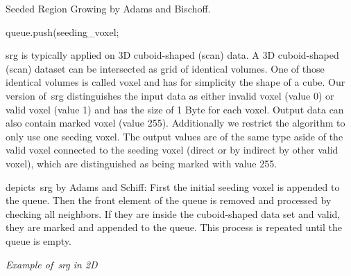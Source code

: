 \documentclass{article}
\begin{document}
\begin{center}
\begin{algorithm}[H]
 \DontPrintSemicolon
 \caption{Seeded Region Growing by Adams and Bischoff.} \label{alg:srg}
 queue.push(seeding\_voxel; 
\end{algorithm}
\end{center}
\ac{srg} is typically applied on 3D cuboid-shaped (scan) data.
A 3D cuboid-shaped (scan) dataset can be intersected as grid of identical volumes.
One of those identical volumes is called voxel and has for simplicity the shape of a cube.
Our version of~\ac{srg} distinguishes the input data as either invalid voxel (value 0) or valid voxel (value 1) and has the size of 1 Byte for each voxel.
Output data can also contain marked voxel (value 255).
Additionally we restrict the algorithm to only use one seeding voxel.
The output values are of the same type aside of the valid voxel connected to the seeding voxel (direct or by indirect by other valid voxel), which are distinguished as being marked with value 255.\par
{} depicts~\ac{srg} by Adams and Schiff:
First the initial seeding voxel is appended to the queue.
Then the front element of the queue is removed and processed by checking all neighbors.
If they are inside the cuboid-shaped data set and valid, they are marked and appended to the queue.
This process is repeated until the queue is empty.\par
\textit{Example of~\ac{srg} in 2D}
\end{document}
